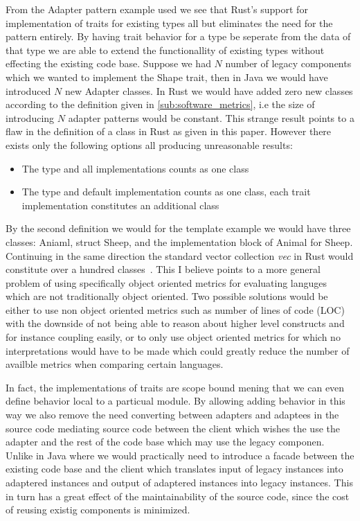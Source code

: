 \documentclass[conference]{IEEEtran}
\begin{document}
From the Adapter pattern example used we see that Rust's support for implementation of traits for existing types all but eliminates the need for the pattern entirely.
By having trait behavior for a type be seperate from the data of that type we are able to extend the functionallity of existing types without effecting the existing code base.
Suppose we had $N$ number of legacy components which we wanted to implement the Shape trait, then in Java we would have introduced $N$ new Adapter classes. 
In Rust we would have added zero new classes according to the definition given in \autoref{sub:software_metrics}, i.e the size of introducing $N$ adapter patterns would be constant.
This strange result points to a flaw in the definition of a class in Rust as given in this paper.
However there exists only the following options all producing unreasonable results:
\begin{itemize}
    \item The type and all implementations counts as one class
    \item The type and default implementation counts as one class, each trait implementation constitutes an additional class
\end{itemize}
By the second definition we would for the template example we would have three classes: Aniaml, struct Sheep, and the implementation block of Animal for Sheep.
Continuing in the same direction the standard vector collection \emph{vec} in Rust would constitute over a hundred classes~\cite{rustdoc:vec}.
This I believe points to a more general problem of using specifically object oriented metrics for evaluating languges which are not traditionally object oriented.
Two possible solutions would be either to use non object oriented metrics such as number of lines of code (LOC) with the downside of not being able to reason about higher level constructs and for instance coupling easily, or to only use object oriented metrics for which no interpretations would have to be made which could greatly reduce the number of availble metrics when comparing certain languages.

In fact, the implementations of traits are scope bound mening that we can even define behavior local to a particual module.
By allowing adding behavior in this way we also remove the need converting between adapters and adaptees in the source code mediating source code between the client which wishes the use the adapter and the rest of the code base which may use the legacy componen.
Unlike in Java where we would practically need to introduce a facade between the existing code base and the client which translates input of legacy instances into adaptered instances and output of adaptered instances into legacy instances.
This in turn has a great effect of the maintainability of the source code, since the cost of reusing existig components is minimized.
\end{document}
